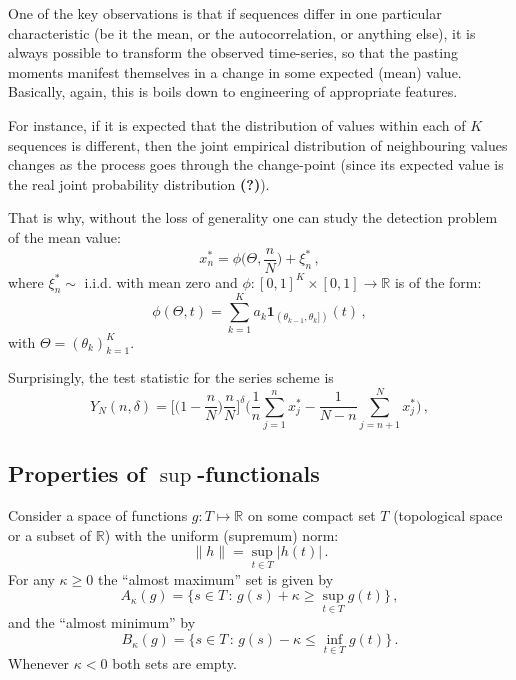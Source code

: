 \documentclass[a4paper]{article}
\newcommand{\Real}{\mathbb{R}}
\newcommand{\one}{\mathbf{1}}
\newcommand{\wat}{\textbf{(?)}}
\begin{document}
One of the key observations is that if sequences differ in one particular characteristic
(be it the mean, or the autocorrelation, or anything else), it is always possible to
transform the observed time-series, so that the pasting moments manifest themselves
in a change in some expected (mean) value. Basically, again, this is boils down to
engineering of appropriate features.

For instance, if it is expected that the distribution of values within each of $K$
sequences is different, then the joint empirical distribution of neighbouring values
changes as the process goes through the change-point (since its expected value is
the real joint probability distribution \wat).

That is why, without the loss of generality one can study the detection problem of
the mean value:
\[ x^*_n = \phi\biggl(\Theta, \frac{n}{N}\biggr) + \xi^*_n\,, \]
where $\xi^*_n\sim$ i.i.d. with mean zero and $\phi: [0,1]^K\times[0,1]\to \Real$ is
of the form:
\[ \phi(\Theta, t) = \sum_{k=1}^K a_k \one_{(\theta_{k-1},\theta_k])}(t) \,, \]
with $\Theta = (\theta_k)_{k=1}^K$.


Surprisingly, the test statistic for the series scheme is
\[ Y_N(n,\delta) = \biggl[ \biggl(1-\frac{n}{N}\biggr) \frac{n}{N} \biggr]^\delta
				  \biggl(  \frac{1}{n} \sum_{j=1}^n x^*_j
				  		 - \frac{1}{N-n} \sum_{j=n+1}^N x^*_j \biggr) \,, \]



\subsection{Properties of $\sup$-functionals} %
\label{sub:properties_of_sup_functionals}

Consider a space of functions $g: T\mapsto \Real$ on some compact set $T$ (topological space
or a subset of $\Real$) with the uniform (supremum) norm:
\[ \|h\| = \sup_{t\in T} | h(t) | \,. \]
For any $\kappa\geq 0$ the ``almost maximum'' set is given by
\[ A_\kappa(g) = \bigl\{ s\in T \,:\, g(s) + \kappa \geq \sup_{t\in T} g(t) \bigr\}\,, \]
and the ``almost minimum'' by
\[ B_\kappa(g) = \bigl\{ s\in T \,:\, g(s) - \kappa \leq \inf_{t\in T} g(t) \bigr\}\,. \]
Whenever $\kappa<0$ both sets are empty.
\end{document}
